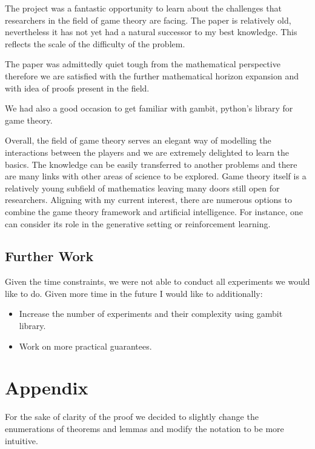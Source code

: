 \documentclass[]{spie}  %
\begin{document}
The project was a fantastic opportunity to learn about the challenges that researchers in the field of game theory are facing. The paper is relatively old, nevertheless it has not yet had a natural successor to my best knowledge. This reflects the scale of the difficulty of the problem.

The paper was admittedly quiet tough from the mathematical perspective therefore we are satisfied with the further mathematical horizon expansion and with idea of proofs present in the field.

We had also a good occasion to get familiar with gambit, python's library for game theory.

Overall, the field of game theory serves an elegant way of modelling the interactions between the players and we are extremely delighted to learn the basics. The knowledge can be easily transferred to another problems and there are many links with other areas of science to be explored. Game theory itself is a relatively young subfield of mathematics leaving many doors still open for researchers. Aligning with my current interest, there are numerous options to combine the game theory framework and artificial intelligence. For instance, one can consider its role in the generative setting or reinforcement learning.

\subsection{Further Work}
\label{sec:conclusion2}

Given the time constraints, we were not able to conduct all experiments we would like to do. Given more time in the future I would like to additionally:
\begin{itemize}
    \item Increase the number of experiments and their complexity using gambit library.
    \item Work on more practical guarantees.
\end{itemize}


\section{Appendix}
\label{sec:appendix}

For the sake of clarity of the proof we decided to slightly change the enumerations of theorems and lemmas and modify the notation to be more intuitive.
\end{document}
